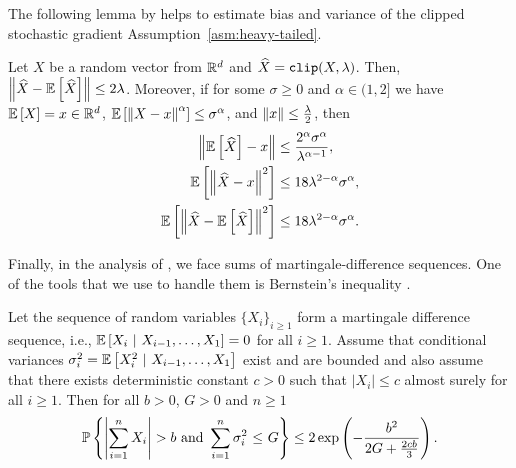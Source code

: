 \documentclass{article}
\begin{document}
The following lemma by \citet{sadiev2023high} helps to estimate bias and variance of the clipped stochastic gradient  Assumption~\ref{asm:heavy-tailed}.
\begin{lemma}
\label{lem: clip-effect}
    Let $X$ be a random vector from ${\mathbb R}^d$ and $\widehat{X} = \texttt{clip}(X, \lambda)$. Then, $\left\lVert\widehat{X} - {\mathbb E}\left[\widehat{X}\right]\right\rVert \leq 2\lambda$. Moreover, if for some $\sigma \geq 0$ and $\alpha \in (1, 2]$ we have ${\mathbb E}\left[X\right] = x \in {\mathbb R}^d$, ${\mathbb E}\left[\left\lVert X - x\right\rVert^\alpha\right] \leq \sigma^\alpha$, and $\left\lVert x\right\rVert \leq \frac{\lambda}{2}$, then
    \begin{align*}
        \left\lVert{\mathbb E}\left[\widehat{X}\right] - x\right\rVert &\leq \frac{2^\alpha\sigma^\alpha}{\lambda^{\alpha - 1}},\\
        {\mathbb E}\left[\left\lVert\widehat{X} - x\right\rVert^2\right] &\leq 18\lambda^{2-\alpha}\sigma^\alpha,\\
        {\mathbb E}\left[\left\lVert\widehat{X} - {\mathbb E}\left[\widehat{X}\right]\right\rVert^2\right] &\leq 18\lambda^{2-\alpha}\sigma^\alpha.\\
    \end{align*}
\end{lemma}

Finally, in the analysis of , we face  sums of martingale-difference sequences. One of the tools that we use to handle them is Bernstein's inequality \citep{bennett1962probability, dzhaparidze2001bernstein, freedman1975tail}.

\begin{lemma}
\label{lem: bernstein}
    Let the sequence of random variables $\{X_i\}_{i \geq 1}$ form a martingale difference sequence, i.e., ${\mathbb E}\left[X_i \ | \ X_{i-1}, \ldots, X_1\right] = 0$ for all $i \geq 1$. Assume that conditional variances $\sigma_i^2 = {\mathbb E}\left[X_i^2 \ | \ X_{i-1}, \ldots, X_1\right]$ exist and are bounded and also assume that there exists deterministic constant $c > 0$ such that $|X_i| \leq c$ almost surely for all $i \geq 1$. Then for all $b > 0$, $G > 0$ and $n \geq 1$
    \begin{align*}
        \mathbb{P}\left\{\left\lvert\sum\limits_{i=1}^n X_i\right\rvert > b \text{ and } \sum\limits_{i=1}^n \sigma_i^2~{\color{black}\leq}~G\right\} \leq 2\exp\left(-\frac{b^2}{2G + \frac{2cb}{3}}\right).
    \end{align*}

\end{lemma}

\newpage
\end{document}
